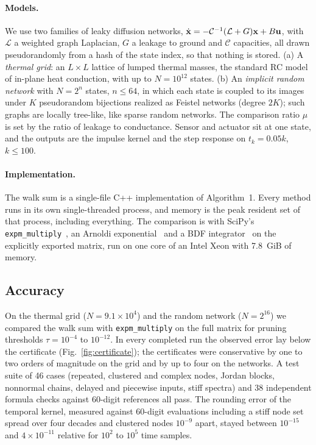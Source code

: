 \documentclass[aps,pra,superscriptaddress,floatfix,longbibliography,twocolumn]{revtex4-2}
\newcommand{\bx}{{\bf x}}
\newcommand{\bu}{{\bf u}}
\begin{document}
\paragraph*{Models.} We use two families of leaky diffusion networks, $\dot\bx=-\mathcal{C}^{-1}(\mathcal{L}+G)\bx+B\bu$, with $\mathcal{L}$ a weighted graph Laplacian, $G$ a leakage to ground and $\mathcal{C}$ capacities, all drawn pseudorandomly from a hash of the state index, so that nothing is stored. (a) A \emph{thermal grid}: an $L\times L$ lattice of lumped thermal masses, the standard RC model of in-plane heat conduction, with up to $N=10^{12}$ states. (b) An \emph{implicit random network} with $N=2^n$ states, $n\le64$, in which each state is coupled to its images under $K$ pseudorandom bijections realized as Feistel networks (degree $2K$); such graphs are locally tree-like, like sparse random networks. The comparison ratio $\mu$ is set by the ratio of leakage to conductance. Sensor and actuator sit at one state, and the outputs are the impulse kernel and the step response on $t_k=0.05k$, $k\le100$.

\paragraph*{Implementation.} The walk sum is a single-file C++ implementation of Algorithm~1. Every method runs in its own single-threaded process, and memory is the peak resident set of that process, including everything. The comparison is with SciPy's \texttt{expm\_multiply}~\cite{almohy2011,virtanen2020}, an Arnoldi exponential~\cite{hochbruck1997,sidje1998} and a BDF integrator~\cite{shampine1997} on the explicitly exported matrix, run on one core of an Intel Xeon with 7.8~GiB of memory.

\subsection{Accuracy}\label{sec:accuracy}
On the thermal grid ($N=9.1\times10^4$) and the random network ($N=2^{16}$) we compared the walk sum with \texttt{expm\_multiply} on the full matrix for pruning thresholds $\tau=10^{-4}$ to $10^{-12}$. In every completed run the observed error lay below the certificate (Fig.~\ref{fig:certificate}); the certificates were conservative by one to two orders of magnitude on the grid and by up to four on the networks. A test suite of 46 cases (repeated, clustered and complex nodes, Jordan blocks, nonnormal chains, delayed and piecewise inputs, stiff spectra) and 38 independent formula checks against 60-digit references all pass. The rounding error of the temporal kernel, measured against 60-digit evaluations including a stiff node set spread over four decades and clustered nodes $10^{-9}$ apart, stayed between $10^{-15}$ and $4\times10^{-11}$ relative for $10^2$ to $10^5$ time samples.
\end{document}
